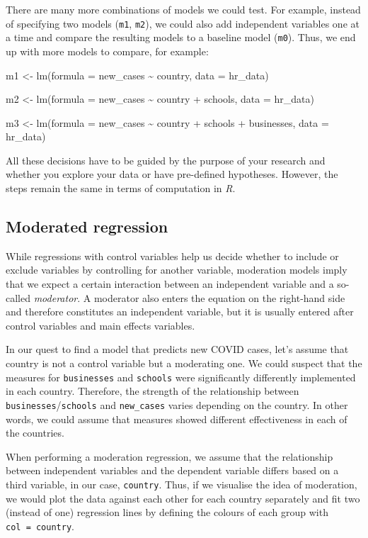 \documentclass[
  letterpaper,
  DIV=11,
  numbers=noendperiod]{scrreprt}
\begin{document}
There are many more combinations of models we could test. For example,
instead of specifying two models (\texttt{m1}, \texttt{m2}), we could
also add independent variables one at a time and compare the resulting
models to a baseline model (\texttt{m0}). Thus, we end up with more
models to compare, for example:

\label{four-hierarchical-regressions-nested}
m1 \textless- lm(formula = new\_cases \textasciitilde{} country, data =
hr\_data)

m2 \textless- lm(formula = new\_cases \textasciitilde{} country +
schools, data = hr\_data)

m3 \textless- lm(formula = new\_cases \textasciitilde{} country +
schools + businesses, data = hr\_data)

All these decisions have to be guided by the purpose of your research
and whether you explore your data or have pre-defined hypotheses.
However, the steps remain the same in terms of computation in \emph{R}.

\subsection{Moderated regression}\label{sec-moderated-regression}

While regressions with control variables help us decide whether to
include or exclude variables by controlling for another variable,
moderation models imply that we expect a certain interaction between an
independent variable and a so-called \emph{moderator}. A moderator also
enters the equation on the right-hand side and therefore constitutes an
independent variable, but it is usually entered after control variables
and main effects variables.

In our quest to find a model that predicts new COVID cases, let's assume
that country is not a control variable but a moderating one. We could
suspect that the measures for \texttt{businesses} and \texttt{schools}
were significantly differently implemented in each country. Therefore,
the strength of the relationship between
\texttt{businesses}/\texttt{schools} and \texttt{new\_cases} varies
depending on the country. In other words, we could assume that measures
showed different effectiveness in each of the countries.

When performing a moderation regression, we assume that the relationship
between independent variables and the dependent variable differs based
on a third variable, in our case, \texttt{country}. Thus, if we
visualise the idea of moderation, we would plot the data against each
other for each country separately and fit two (instead of one)
regression lines by defining the colours of each group with
\texttt{col\ =\ country}.
\end{document}
